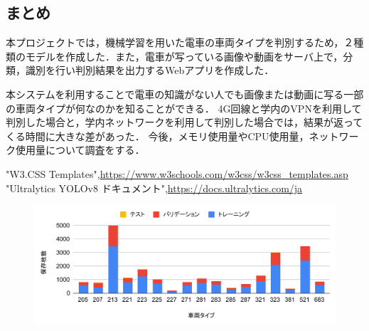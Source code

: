 \begin{multicols*}{2}
\section{まとめ}
本プロジェクトでは，機械学習を用いた電車の車両タイプを判別するため，２種類のモデルを作成した．また，電車が写っている画像や動画をサーバ上で，分類，識別を行い判別結果を出力するWebアプリを作成した．

本システムを利用することで電車の知識がない人でも画像または動画に写る一部の車両タイプが何なのかを知ることができる．
4G回線と学内のVPNを利用して判別した場合と，学内ネットワークを利用して判別した場合では，結果が返ってくる時間に大きな差があった．
今後，メモリ使用量やCPU使用量，ネットワーク使用量について調査をする．

\begin{thebibliography}{99}

	
	"W3.CSS Templates",\url{https://www.w3schools.com/w3css/w3css_templates.asp}
	"Ultralytics YOLOv8 ドキュメント",\url{https://docs.ultralytics.com/ja}
\end{thebibliography}


\begin{figure}
	\centering
	\includegraphics[width=\linewidth]{obj/chart2.pdf}
\end{figure}



\end{multicols*}
